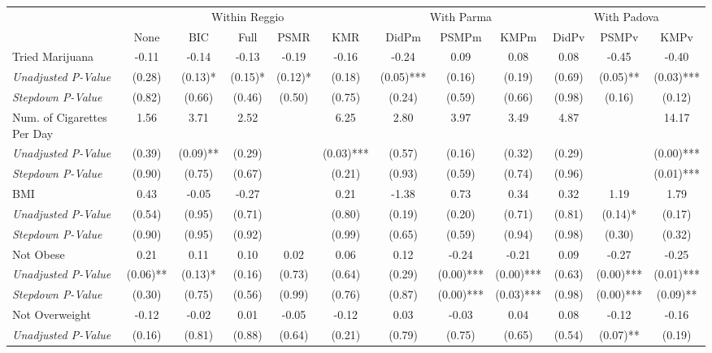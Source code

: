 \begin{tabular}{l c c c c c c c c c c c}
\toprule
& \multicolumn{5}{c}{Within Reggio} & \multicolumn{3}{c}{With Parma} & \multicolumn{3}{c}{With Padova} \\\cmidrule(lr){2-6} \cmidrule(lr){7-9} \cmidrule(lr){10-12}
 & None & BIC & Full & PSMR & KMR & DidPm & PSMPm & KMPm & DidPv & PSMPv & KMPv \\
\midrule
Tried Marijuana & -0.11 & -0.14 & -0.13 & -0.19 & -0.16 & -0.24 & 0.09 & 0.08 & 0.08 & -0.45 & -0.40 \\
\quad \textit{Unadjusted P-Value} & (0.28) & (0.13)* & (0.15)* & (0.12)* & (0.18) & (0.05)*** & (0.16) & (0.19) & (0.69) & (0.05)** & (0.03)*** \\
\quad \textit{Stepdown P-Value} & (0.82) & (0.66) & (0.46) & (0.50) & (0.75) & (0.24) & (0.59) & (0.66) & (0.98) & (0.16) & (0.12) \\
Num. of Cigarettes Per Day & 1.56 & 3.71 & 2.52 & & 6.25 & 2.80 & 3.97 & 3.49 & 4.87 & & 14.17 \\
\quad \textit{Unadjusted P-Value} & (0.39) & (0.09)** & (0.29) & & (0.03)*** & (0.57) & (0.16) & (0.32) & (0.29) & & (0.00)*** \\
\quad \textit{Stepdown P-Value} & (0.90) & (0.75) & (0.67) & & (0.21) & (0.93) & (0.59) & (0.74) & (0.96) & & (0.01)*** \\
BMI & 0.43 & -0.05 & -0.27 & & 0.21 & -1.38 & 0.73 & 0.34 & 0.32 & 1.19 & 1.79 \\
\quad \textit{Unadjusted P-Value} & (0.54) & (0.95) & (0.71) & & (0.80) & (0.19) & (0.20) & (0.71) & (0.81) & (0.14)* & (0.17) \\
\quad \textit{Stepdown P-Value} & (0.90) & (0.95) & (0.92) & & (0.99) & (0.65) & (0.59) & (0.94) & (0.98) & (0.30) & (0.32) \\
Not Obese & 0.21 & 0.11 & 0.10 & 0.02 & 0.06 & 0.12 & -0.24 & -0.21 & 0.09 & -0.27 & -0.25 \\
\quad \textit{Unadjusted P-Value} & (0.06)** & (0.13)* & (0.16) & (0.73) & (0.64) & (0.29) & (0.00)*** & (0.00)*** & (0.63) & (0.00)*** & (0.01)*** \\
\quad \textit{Stepdown P-Value} & (0.30) & (0.75) & (0.56) & (0.99) & (0.76) & (0.87) & (0.00)*** & (0.03)*** & (0.98) & (0.00)*** & (0.09)** \\
Not Overweight & -0.12 & -0.02 & 0.01 & -0.05 & -0.12 & 0.03 & -0.03 & 0.04 & 0.08 & -0.12 & -0.16 \\
\quad \textit{Unadjusted P-Value} & (0.16) & (0.81) & (0.88) & (0.64) & (0.21) & (0.79) & (0.75) & (0.65) & (0.54) & (0.07)** & (0.19) \\

\end{tabular}

